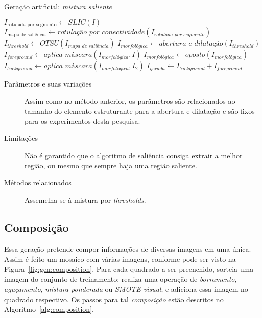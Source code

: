 \begin{algorithm}[!htbp]
  \caption{Geração artificial: \emph{mistura saliente}}
  \label{alg:saliency}
  \SetAlgoLined

  $I_{\text{rotulada por segmento}} \gets SLIC(I)$\;
  $I_{\text{mapa de saliência}} \gets \textit{rotulação por conectividade}(I_{\textit{rotulada por segmento}})$\;
  $I_{threshold} \gets OTSU(I_{\textit{mapa de saliência}})$\;
  $I_{\textit{morfológica}} \gets \textit{abertura e dilatação} (I_{threshold})$\;
  $I_{foreground} \gets \textit{aplica máscara}(I_{\textit{morfológica}}, I) $\;
  $I_{\textit{morfológica}} \gets \textit{oposto}(I_{\textit{morfológica}})$\;
  $I_{background} \gets \textit{aplica máscara}(I_{\textit{morfológica}}, I_2) $\;
  $I_{gerada} \gets I_{background} + I_{foreground}$\;
\end{algorithm}

\begin{description}
  \item[Parâmetros e suas variações] Assim como no método anterior, os parâmetros são relacionados ao tamanho do elemento estruturante para a abertura e dilatação e são fixos para os experimentos desta pesquisa.

  \item[Limitações] Não é garantido que o algoritmo de saliência consiga extrair
  a melhor região, ou mesmo que sempre haja uma região saliente.

  \item[Métodos relacionados] Assemelha-se à mistura por \textit{thresholds}.
\end{description}
\FloatBarrier
\subsection{Composição}

Essa geração pretende compor informações de diversas imagens em uma única. Assim é feito um mosaico com várias imagens, conforme pode ser visto na  Figura~\ref{fig:gen:composition}. Para cada quadrado a ser preenchido, sorteia uma imagem do conjunto de treinamento; realiza uma operação de \emph{borramento}, \emph{aguçamento}, \emph{mistura ponderada} ou \emph{SMOTE visual}; e adiciona essa imagem no quadrado respectivo. Os passos para tal \emph{composição} estão descritos no Algoritmo~\ref{alg:composition}.

